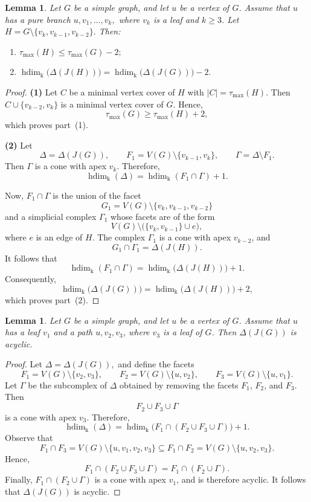 \documentclass[12pt,amscd]{amsart}
\newtheorem{lem}[thm]{Lemma}
\theoremstyle{definition}
\DeclareMathOperator{\hdim}{hdim}
\def\k {\mathrm k}
\begin{document}
\begin{lem}\label{lem_reduction_2}
Let $G$ be a simple graph, and let $u$ be a vertex of $G$. Assume that $u$ has a pure branch
\(u, v_1, \ldots, v_k,\) where $v_k$ is a leaf and $k \ge 3$. Let
\(H = G \setminus \{v_k, v_{k-1}, v_{k-2}\}. \) Then:
\begin{enumerate}
    \item     \(    \tau_{\max}(H) \le \tau_{\max}(G) - 2;    \)

    \item     \(    \hdim_{\k}\bigl(\Delta(J(H))\bigr)
    =
    \hdim_{\k}\bigl(\Delta(J(G))\bigr) - 2.
    \)
\end{enumerate}
\end{lem}

\begin{proof}
\textbf{(1)} Let $C$ be a minimal vertex cover of $H$ with
\( |C| = \tau_{\max}(H).\) Then
\( C \cup \{v_{k-2}, v_k\} \) is a minimal vertex cover of $G$. Hence,
\[
\tau_{\max}(G) \ge \tau_{\max}(H) + 2,
\]
which proves part~(1).

\medskip

\textbf{(2)} Let
\[
\Delta = \Delta(J(G)),
\qquad
F_1 = V(G) \setminus \{v_{k-1}, v_k\}, \qquad
\Gamma = \Delta \setminus F_1.
\]
Then $\Gamma$ is a cone with apex $v_k$. Therefore,
\[
\hdim_{\k}(\Delta)
=
\hdim_{\k}(F_1 \cap \Gamma) + 1.
\]

Now, $F_1 \cap \Gamma$ is the union of the facet
\[
G_1 = V(G) \setminus \{v_k, v_{k-1}, v_{k-2}\}
\]
and a simplicial complex $\Gamma_1$ whose facets are of the form
\[
V(G) \setminus \bigl(\{v_k, v_{k-1}\} \cup e\bigr),
\]
where $e$ is an edge of $H$. The complex $\Gamma_1$ is a cone with apex $v_{k-2}$, and
\[
G_1 \cap \Gamma_1 = \Delta(J(H)).
\]
It follows that
\[
\hdim_{\k}(F_1 \cap \Gamma)
=
\hdim_{\k}\bigl(\Delta(J(H))\bigr) + 1.
\]
Consequently,
\[
\hdim_{\k}\bigl(\Delta(J(G))\bigr)
=
\hdim_{\k}\bigl(\Delta(J(H))\bigr) + 2,
\]
which proves part~(2).
\end{proof}

\begin{lem}\label{lem_reduction_3}
Let $G$ be a simple graph, and let $u$ be a vertex of $G$. Assume that $u$ has a leaf $v_1$ and a path \( u, v_2, v_3\), where $v_3$ is a leaf of $G$. Then $\Delta(J(G))$ is acyclic.
\end{lem}

\begin{proof}
Let \( \Delta = \Delta(J(G)), \) and define the facets
\[
F_1 = V(G) \setminus \{v_2, v_3\}, \qquad
F_2 = V(G) \setminus \{u, v_2\}, \qquad
F_3 = V(G) \setminus \{u, v_1\}.
\]
Let $\Gamma$ be the subcomplex of $\Delta$ obtained by removing the facets $F_1$, $F_2$, and $F_3$. Then
\[
F_2 \cup F_3 \cup \Gamma
\]
is a cone with apex $v_3$. Therefore,
\[
\hdim_{\k}(\Delta)
=
\hdim_{\k}\bigl(F_1 \cap (F_2 \cup F_3 \cup \Gamma)\bigr) + 1.
\]
Observe that
\[
F_1 \cap F_3
=
V(G) \setminus \{u, v_1, v_2, v_3\}
\subseteq
F_1 \cap F_2
=
V(G) \setminus \{u, v_2, v_3\}.
\]
Hence,
\[
F_1 \cap (F_2 \cup F_3 \cup \Gamma)
=
F_1 \cap (F_2 \cup \Gamma).
\]
Finally, $F_1 \cap (F_2 \cup \Gamma)$ is a cone with apex $v_1$, and is therefore acyclic. It follows that $\Delta(J(G))$ is acyclic.
\end{proof}
\end{document}
